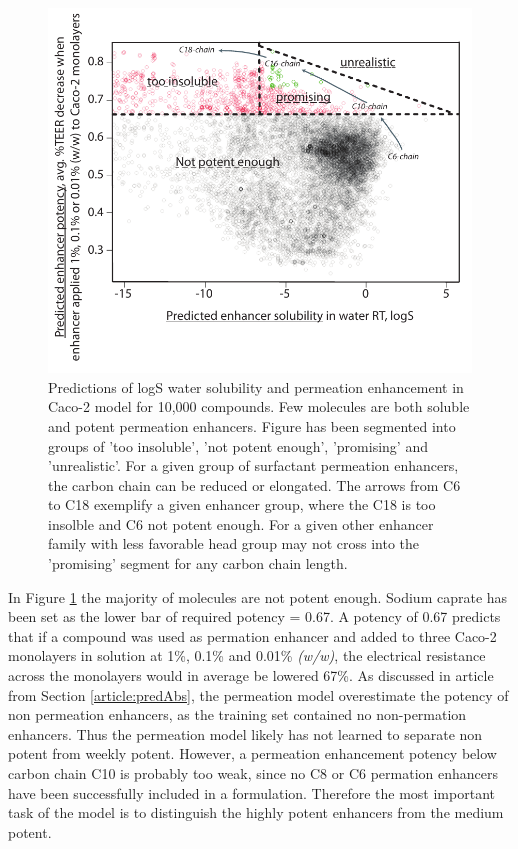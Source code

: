 \begin{figure}[!htbp]
\includegraphics[width=\textwidth,height=\textheight,keepaspectratio]{graphics/screened_molecules3.pdf}
\caption{Predictions of logS water solubility and permeation enhancement in Caco-2 model for 10,000 compounds. Few molecules are both soluble and potent permeation enhancers. Figure has been segmented into groups of 'too insoluble', 'not potent enough', 'promising' and 'unrealistic'. For a given group of surfactant permeation enhancers, the carbon chain can be reduced or elongated. The arrows from C6 to C18 exemplify a given enhancer group, where the C18 is too insolble and C6 not potent enough. For a given other enhancer family with less favorable head group may not cross into the 'promising' segment for any carbon chain length.}
\label{predictionsCombined}
\end{figure}

In Figure \ref{predictionsCombined} the majority of molecules are not potent enough. Sodium caprate has been set as the lower bar of required potency = 0.67. A potency of 0.67 predicts that if a compound was used as permation enhancer and added to three Caco-2 monolayers in solution at 1\%, 0.1\% and 0.01\% \textit{(w/w)}, the electrical resistance across the monolayers would in average be lowered 67\%. As discussed in article from Section \ref{article:predAbs}, the permeation model overestimate the potency of non permeation enhancers, as the training set contained no non-permation enhancers. Thus the permeation model likely has not learned to separate non potent from weekly potent. However, a permeation enhancement potency below carbon chain C10 is probably too weak, since no C8 or C6 permation enhancers have been successfully included in a formulation. Therefore the most important task of the model is to distinguish the highly potent enhancers from the medium potent.

